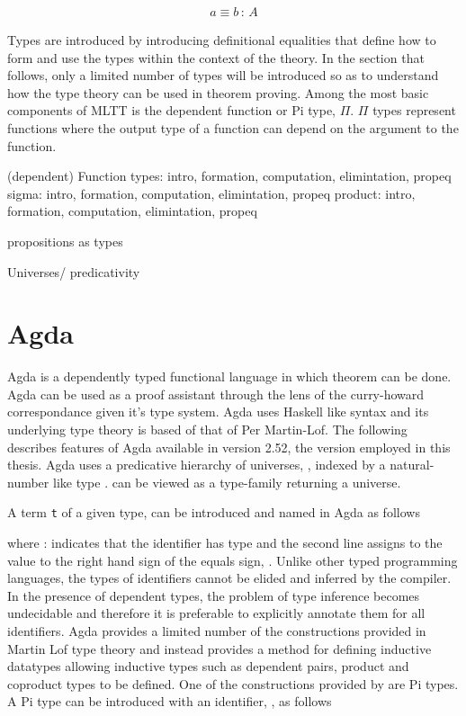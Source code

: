\begin{align*}
    a \equiv b \, : \, A
\end{align*}

Types are introduced by introducing definitional equalities that define how to
form and use the types within the context of the theory. In the section that
follows, only a limited number of types will be introduced so as to understand
how the type theory can be used in theorem proving. Among the most basic
components of MLTT is the dependent function or Pi type, $\Pi$. $\Pi$ types
represent functions where the output type of a function can depend on the
argument to the function.

(dependent) Function types: intro, formation, computation, elimintation, propeq
sigma: intro, formation, computation, elimintation, propeq
product: intro, formation, computation, elimintation, propeq

propositions as types

Universes/ predicativity

\section{Agda}

Agda is a dependently typed functional language in which theorem can be done.
Agda can be used as a proof assistant through the lens of the curry-howard
correspondance given it's type system. Agda uses Haskell like syntax and its
underlying type theory is based of that of Per Martin-Lof. The following
describes features of Agda available in version 2.52, the version employed in
this thesis. Agda uses a predicative hierarchy of universes,
, indexed by a natural-number like type
.  can be viewed as a type-family
returning a universe.

A term \verb|t| of a given type,  can be introduced and named
in Agda as follows



where  :  indicates that the identifier
 has type  and the second line assigns to
 the value to the right hand sign of the equals sign,
. Unlike other typed programming languages, the types of
identifiers cannot be elided and inferred by the compiler. In the presence of
dependent types, the problem of type inference becomes undecidable and therefore
it is preferable to explicitly annotate them for all identifiers. Agda provides
a limited number of the constructions provided in Martin Lof type theory and
instead provides a method for defining inductive datatypes allowing inductive
types such as dependent pairs, product and coproduct types to be defined. One of
the constructions provided by are Pi types. A Pi type can be introduced with an
identifier, , as follows

